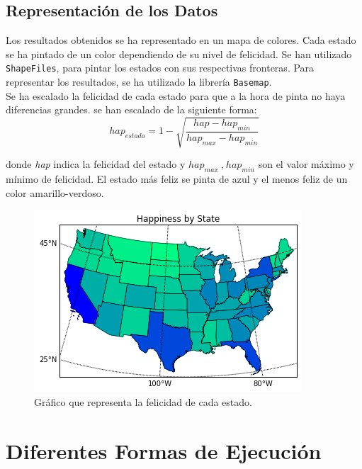 \documentclass[12pt,a4paper]{article}
\begin{document}
\subsection{Representación de los Datos}
Los resultados obtenidos se ha representado en un mapa de colores. Cada estado se ha pintado de un color dependiendo de su nivel de felicidad. Se han utilizado \texttt{ShapeFiles}, para pintar los estados con sus respectivas fronteras. Para representar los resultados, se ha utilizado la librería \texttt{Basemap}.\\

Se ha escalado la felicidad de cada estado para que a la hora de pinta no haya diferencias grandes. se han escalado de la siguiente forma:
$$hap_{estado}=1-\displaystyle \sqrt{\dfrac{hap-hap_{min}}{hap_{max}-hap_{min}}}$$

donde \textit{hap} indica la felicidad del estado y $hap_{max}\ \text{,}\ hap_{min}$ son el valor máximo y mínimo de felicidad.
El estado más feliz se pinta de azul y el menos feliz de un color amarillo-verdoso.

\begin{figure}[h]
\centering
\includegraphics[scale=1]{happiness.png}
\caption{Gráfico que representa la felicidad de cada estado.}
\end{figure}

\section{Diferentes Formas de Ejecución}
\end{document}
